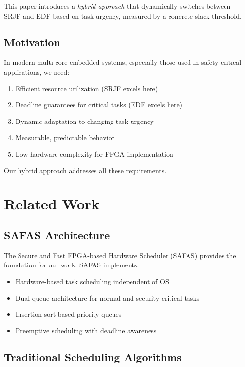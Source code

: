 \documentclass[conference]{IEEEtran}
\begin{document}
This paper introduces a \textit{hybrid approach} that dynamically switches between SRJF and EDF based on task urgency, measured by a concrete slack threshold.

\subsection{Motivation}

In modern multi-core embedded systems, especially those used in safety-critical applications, we need:
\begin{enumerate}
    \item Efficient resource utilization (SRJF excels here)
    \item Deadline guarantees for critical tasks (EDF excels here)
    \item Dynamic adaptation to changing task urgency
    \item Measurable, predictable behavior
    \item Low hardware complexity for FPGA implementation
\end{enumerate}

Our hybrid approach addresses all these requirements.

\section{Related Work}

\subsection{SAFAS Architecture}
The Secure and Fast FPGA-based Hardware Scheduler (SAFAS) \cite{norollah2022} provides the foundation for our work. SAFAS implements:
\begin{itemize}
    \item Hardware-based task scheduling independent of OS
    \item Dual-queue architecture for normal and security-critical tasks
    \item Insertion-sort based priority queues
    \item Preemptive scheduling with deadline awareness
\end{itemize}

\subsection{Traditional Scheduling Algorithms}
\end{document}
